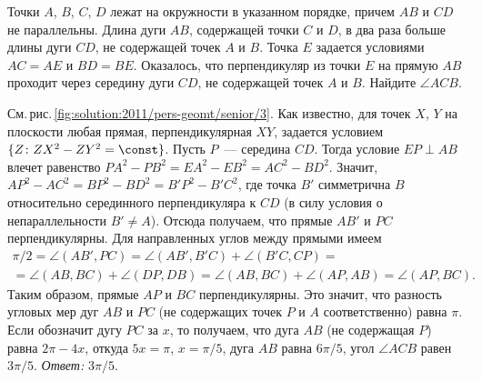 Точки $A$, $B$, $C$, $D$ лежат на окружности в указанном порядке, причем $AB$ и
$CD$ не параллельны.
Длина дуги $AB$, содержащей точки $C$ и $D$, в два раза больше длины дуги $CD$,
не содержащей точек $A$ и $B$.
Точка $E$ задается условиями $AC = AE$ и $BD = BE$.
Оказалось, что перпендикуляр из точки $E$ на прямую $AB$ проходит через
середину дуги $CD$, не содержащей точек $A$ и $B$.
Найдите $\angle ACB$.



%
\label{solution:2011/pers-geomt/senior/3}%
См.\,рис.\,\ref{fig:solution:2011/pers-geomt/senior/3}.
Как известно, для точек $X$, $Y$ на плоскости любая прямая, перпендикулярная
$XY$, задается условием
$\{Z \colon ZX^2 - ZY^2 = \const\}$.
Пусть $P$~--- середина $CD$.
Тогда условие $EP \perp AB$ влечет равенство
$P A^2 - P B^2 = E A^2 - E B^2 = A C^2 - B D^2$.
Значит, $A P^2 - A C^2 = B P^2 - B D^2 = B' P^2 - B' C^2$, где точка $B'$
симметрична $B$ относительно серединного перпендикуляра к $CD$
(в силу условия о непараллельности $B' \neq A$).
Отсюда получаем, что прямые $AB'$ и $PC$ перпендикулярны.
Для направленных углов между прямыми имеем 
\begin{gather*}
    \pi / 2
=
    \angle (AB', PC)
=
    \angle (AB', B'C) + \angle (B'C, CP)
=\\=
    \angle (AB, BC) + \angle (DP, DB)
=
    \angle (AB, BC) + \angle (AP, AB)
=
    \angle (AP, BC)
.\end{gather*}
Таким образом, прямые $AP$ и $BC$ перпендикулярны.
Это значит, что разность угловых мер дуг $AB$ и $PC$
(не содержащих точек $P$ и $A$ соответственно) равна $\pi$.
Если обозначит дугу $PC$ за $x$, то получаем, что дуга $AB$
(не содержащая $P$) равна $2 \pi - 4 x$, откуда $5 x = \pi$, $x = \pi / 5$,
дуга $AB$ равна $6 \pi / 5$, угол $\angle ACB$ равен $3 \pi / 5$.
\emph{Ответ:} $3 \pi / 5$.

